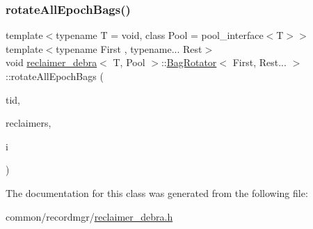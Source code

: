 \subsubsection{\texorpdfstring{rotate\+All\+Epoch\+Bags()}{rotateAllEpochBags()}}
{\footnotesize\ttfamily template$<$typename T  = void, class Pool  = pool\+\_\+interface$<$\+T$>$$>$ \\
template$<$typename First , typename... Rest$>$ \\
void \hyperlink{classreclaimer__debra}{reclaimer\+\_\+debra}$<$ T, Pool $>$\+::\hyperlink{classreclaimer__debra_1_1BagRotator}{Bag\+Rotator}$<$ First, Rest... $>$\+::rotate\+All\+Epoch\+Bags (\begin{DoxyParamCaption}\item[{const int}]{tid,  }\item[{void $\ast$const $\ast$const}]{reclaimers,  }\item[{const int}]{i }\end{DoxyParamCaption})\hspace{0.3cm}{\ttfamily [inline]}}



The documentation for this class was generated from the following file\+:\begin{DoxyCompactItemize}
\item 
common/recordmgr/\hyperlink{reclaimer__debra_8h}{reclaimer\+\_\+debra.\+h}\end{DoxyCompactItemize}
